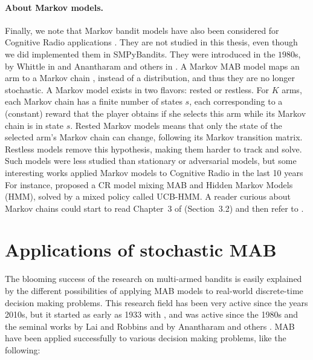 \paragraph{About Markov models.}
%
Finally, we note that Markov bandit models have also been considered for Cognitive Radio applications \cite{Liu08}.
They are not studied in this thesis, even though we did implemented them in SMPyBandits.
They were introduced in the $1980$s, by Whittle in \cite{Whittle1988} and Anantharam and others in \cite{Anantharam87b}.
A Markov MAB model maps an arm to a Markov chain \cite{Norris98}, instead of a distribution, and thus they are no longer stochastic.
A Markov model exists in two flavors: rested or restless.
For $K$ arms, each Markov chain has a finite number of states $s$, each corresponding to a (constant) reward that the player obtains if she selects this arm while its Markov chain is in state $s$.
Rested Markov models means that only the state of the selected arm's Markov chain can change, following its Markov transition matrix.
Restless models remove this hypothesis, making them harder to track and solve.
%
Such models were less studied than stationary or adversarial models, but some interesting works applied Markov models to Cognitive Radio in the last 10 years
For instance, \cite{Melian15} proposed a CR model mixing MAB and Hidden Markov Models (HMM), solved by a mixed policy called UCB-HMM.
A reader curious about Markov chains could start to read Chapter~3 of \cite{LattimoreBanditAlgorithmsBook} (Section~3.2) and then refer to \cite{Norris98}.


\section{Applications of stochastic MAB}
\label{sec:2:applicationsofStochasticMAB}

The blooming success of the research on multi-armed bandits is easily explained by the different possibilities of applying MAB models to real-world discrete-time decision making problems.
This research field has been very active since the years 2010s, but it started as early as 1933 with \cite{Thompson33}, and was active since the 1980s and the seminal works by Lai and Robbins \cite{LaiRobbins85} and by Anantharam and others \cite{Anantharam87a}.
%
MAB have been applied successfully to various decision making problems, like the following:

